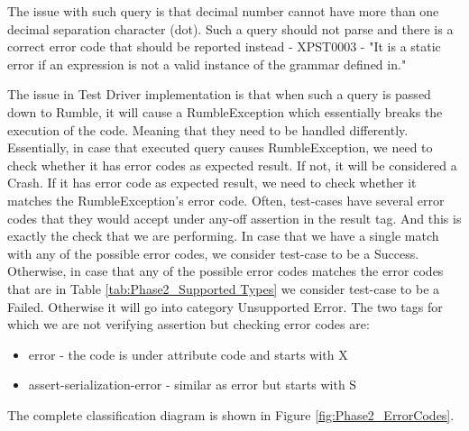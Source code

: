 

The issue with such query is that decimal number cannot have more than one decimal separation character (dot). Such a query should not parse and there is a correct error code that should be reported instead - XPST0003 - "It is a static error if an expression is not a valid instance of the grammar defined in." 

The issue in Test Driver implementation is that when such a query is passed down to Rumble, it will cause a RumbleException which essentially breaks the execution of the code. Meaning that they need to be handled differently. Essentially, in case that executed query causes RumbleException, we need to check whether it has error codes as expected result. If not, it will be considered a Crash. If it has error code as expected result, we need to check whether it matches the RumbleException's error code. Often, test-cases have several error codes that they would accept under any-off assertion in the result tag. And this is exactly the check that we are performing. In case that we have a single match with any of the possible error codes, we consider test-case to be a Success. Otherwise, in case that any of the possible error codes matches the error codes that are in Table \ref{tab:Phase2_Supported Types} we consider test-case to be a Failed. Otherwise it will go into category Unsupported Error. The two tags for which we are not verifying assertion but checking error codes are:
\begin{itemize}
	\item error - the code is under attribute code and starts with X
	\item assert-serialization-error - similar as error but starts with S
\end{itemize}
The complete classification diagram is shown in Figure \ref{fig:Phase2_ErrorCodes}.

